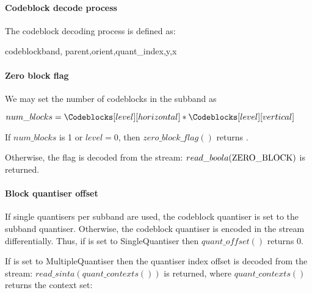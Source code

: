 \paragraph{Codeblock decode process\newline}

The codeblock decoding process is defined as:

\begin{pseudo}{codeblock}{band, parent,orient,quant\_index,y,x}
    \bsEND
  \bsEND
\bsELSE
    \bsEND
  \bsEND

\bsEND

\end{pseudo}

\paragraph{Zero block flag\newline}
\label{zeroblockflag}

We may set the number of codeblocks in the subband as

$num\_blocks = \Codeblocks[level][horizontal]*\Codeblocks[level][vertical]$

If $num\_blocks$ is 1 or $level=0$, then $zero\_block\_flag()$ returns \false.

Otherwise, the flag is decoded from the stream: $read\_boola(\text{ZERO\_BLOCK})$
is returned.

\paragraph{Block quantiser offset\newline}
\label{blockquantidx}

If single quantisers per subband are used, the codeblock quantiser is set to the 
subband quantiser. Otherwise, the codeblock quantiser is encoded in the stream
differentially. Thus, if \CodeblockMode is set to SingleQuantiser then $quant\_offset()$
returns $0$.

If \CodeblockMode is set to MultipleQuantiser then the quantiser index offset
is decoded from the stream: $read\_sinta(quant\_contexts())$ is returned, where
$quant\_contexts()$ returns the context set:


